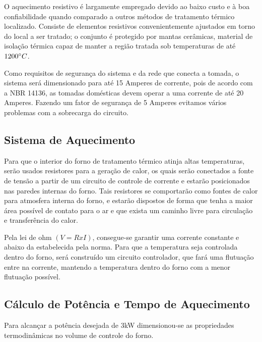 O aquecimento resistivo é largamente empregado devido ao baixo custo e à boa confiabilidade quando comparado a outros métodos de tratamento térmico localizado. Consiste de elementos resistivos convenientemente ajustados em torno do local a ser tratado; o conjunto é protegido por mantas cerâmicas, material de isolação térmica capaz de manter a região tratada sob temperaturas de até $1200\degree C$.

Como requisitos de segurança do sistema e da rede que conecta a tomada, o sistema será dimensionado para até 15 Amperes de corrente, pois de acordo com a NBR 14136, as tomadas domésticas devem operar a uma corrente de até 20 Amperes. Fazendo um fator de segurança de 5 Amperes evitamos vários problemas com a sobrecarga do circuito.

\subsection{Sistema de Aquecimento}
Para que o interior do forno de tratamento térmico atinja altas temperaturas, serão usados resistores para a geração de calor, os quais serão conectados a fonte de tensão a partir de um circuito de controle de corrente e estarão posicionados nas paredes internas do forno. Tais resistores se comportarão como fontes de calor para atmosfera interna do forno, e estarão dispostos de forma que tenha a maior área possível de contato para o ar e que exista um caminho livre para circulação e transferência do calor.

Pela lei de ohm $(V=R x I)$, consegue-se garantir uma corrente constante e abaixo da estabelecida pela norma. Para que a temperatura seja controlada dentro do forno, será construído um circuito controlador, que fará uma flutuação entre na corrente, mantendo a temperatura dentro do forno com a menor flutuação possível.

\subsection{Cálculo de Potência e Tempo de Aquecimento}
Para alcançar a potência desejada de 3kW dimensionou-se as propriedades termodinâmicas no volume de controle do forno.

